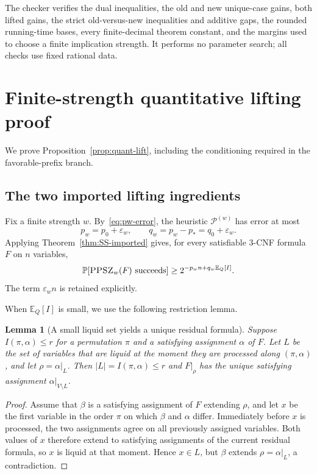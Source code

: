 \documentclass[11pt]{article}
\newtheorem{lemma}[theorem]{Lemma}
\newcommand{\PPSZ}{\textnormal{\textsc{PPSZ}}}
\newcommand{\Pw}{\mathcal P^{(w)}}
\newcommand{\eps}{\varepsilon}
\newcommand{\E}{\mathbb E}
\newcommand{\Prb}{\mathbb P}
\begin{document}
The checker verifies the dual inequalities, the old and new unique-case gains, both lifted gains, the strict old-versus-new inequalities and additive gaps, the rounded running-time bases, every finite-decimal theorem constant, and the margins used to choose a finite implication strength.  It performs no parameter search; all checks use fixed rational data.

\section{Finite-strength quantitative lifting proof}\label{app:lifting-proof}

We prove Proposition~\ref{prop:quant-lift}, including the conditioning required in the favorable-prefix branch.

\subsection{The two imported lifting ingredients}

Fix a finite strength $w$.  By~\eqref{eq:pw-error}, the heuristic $\Pw$ has error at most
\[
 p_w=p_0+\eps_w,
 \qquad
 q_w=p_w-p_*=q_0+\eps_w.
\]
Applying Theorem~\ref{thm:SS-imported} gives, for every satisfiable 3-CNF formula $F$ on $n$ variables,
\begin{equation}\label{eq:finite-high-I}
 \Prb[\PPSZ_w(F)\text{ succeeds}]
 \ge
 2^{-p_wn+q_w\E_Q[I]}.
\end{equation}
The term $\eps_wn$ is retained explicitly.

When $\E_Q[I]$ is small, we use the following restriction lemma.

\begin{lemma}[A small liquid set yields a unique residual formula]\label{lem:liquid-restriction}
Suppose $I(\pi,\alpha)\le r$ for a permutation $\pi$ and a satisfying assignment $\alpha$ of $F$.  Let $L$ be the set of variables that are liquid at the moment they are processed along $(\pi,\alpha)$, and let $\rho=\alpha|_L$.  Then $|L|=I(\pi,\alpha)\le r$ and $F|_\rho$ has the unique satisfying assignment $\alpha|_{V\setminus L}$.
\end{lemma}

\begin{proof}
Assume that $\beta$ is a satisfying assignment of $F$ extending $\rho$, and let $x$ be the first variable in the order $\pi$ on which $\beta$ and $\alpha$ differ.  Immediately before $x$ is processed, the two assignments agree on all previously assigned variables.  Both values of $x$ therefore extend to satisfying assignments of the current residual formula, so $x$ is liquid at that moment.  Hence $x\in L$, but $\beta$ extends $\rho=\alpha|_L$, a contradiction.
\end{proof}
\end{document}
